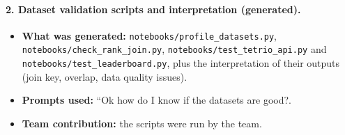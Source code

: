 \documentclass[11pt,a4paper]{article}
\begin{document}
\paragraph{2. Dataset validation scripts and interpretation (generated).}
\begin{itemize}
  \item \textbf{What was generated:} \texttt{notebooks/profile\_datasets.py},
        \texttt{notebooks/check\_rank\_join.py},
        \texttt{notebooks/test\_tetrio\_api.py} and
        \texttt{notebooks/test\_leaderboard.py}, plus the interpretation of
        their outputs (join key, overlap, data quality issues).
  \item \textbf{Prompts used:} ``Ok how do I know if the datasets are
        good?.
  \item \textbf{Team contribution:} the scripts were run by the team.
\end{itemize}
\end{document}
